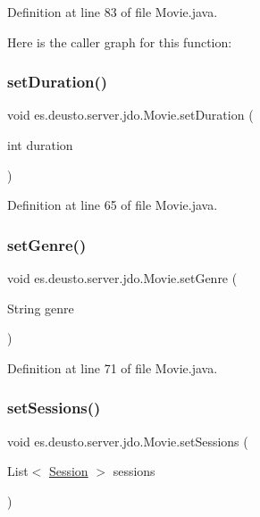 Definition at line 83 of file Movie.\+java.

Here is the caller graph for this function\+:
\mbox{\label{classes_1_1deusto_1_1server_1_1jdo_1_1_movie_a045b89a0ae1e637d8944f34c97f8c34e}} 
\subsubsection{\texorpdfstring{setDuration()}{setDuration()}}
{\footnotesize\ttfamily void es.\+deusto.\+server.\+jdo.\+Movie.\+set\+Duration (\begin{DoxyParamCaption}\item[{int}]{duration }\end{DoxyParamCaption})}



Definition at line 65 of file Movie.\+java.

\mbox{\label{classes_1_1deusto_1_1server_1_1jdo_1_1_movie_aae8757b5e3229b6b521a0b8dab606eff}} 
\subsubsection{\texorpdfstring{setGenre()}{setGenre()}}
{\footnotesize\ttfamily void es.\+deusto.\+server.\+jdo.\+Movie.\+set\+Genre (\begin{DoxyParamCaption}\item[{String}]{genre }\end{DoxyParamCaption})}



Definition at line 71 of file Movie.\+java.

\mbox{\label{classes_1_1deusto_1_1server_1_1jdo_1_1_movie_a76eb3668db335d824abc947053584699}} 
\subsubsection{\texorpdfstring{setSessions()}{setSessions()}}
{\footnotesize\ttfamily void es.\+deusto.\+server.\+jdo.\+Movie.\+set\+Sessions (\begin{DoxyParamCaption}\item[{List$<$ \mbox{\hyperlink{classes_1_1deusto_1_1server_1_1jdo_1_1_session}{Session}} $>$}]{sessions }\end{DoxyParamCaption})}



